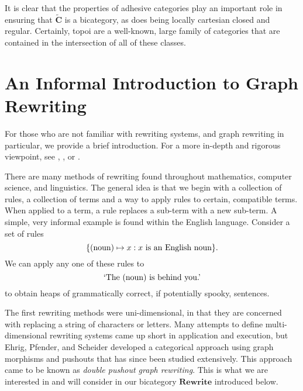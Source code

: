 \documentclass[11pt]{amsart}
\newcommand{\cat}[1]{\mathbf{#1}}
\renewcommand{\t}[1]{\textup{#1}}
\newcommand{\csC}{\widetilde{\mathbf{C}}}
\theoremstyle{remark}
\theoremstyle{definition}
\begin{document}
It is clear that the properties of adhesive categories play an important role in ensuring that $\csC$ is a bicategory, as does being locally cartesian closed and regular.  Certainly, topoi are a well-known, large family of categories that are contained in the intersection of all of these classes. 
%
%
%
%
%
%
%
%
%
%
%
%
%
%
%
%
%
%
%
\section{An Informal Introduction to Graph Rewriting}  %
\label{sec.Rewriting}
%

For those who are not familiar with rewriting systems, and graph rewriting in particular, we provide a brief introduction. For a more in-depth and rigorous viewpoint, see \cite{Baader_TermRewritingAllThat}, \cite{Ehrig_GraphGramAlgAp}, or \cite{LackSoboc_AdhesiveCategories}.

There are many methods of rewriting found throughout mathematics, computer science, and linguistics. The general idea is that we begin with a collection of rules, a collection of terms and a way to apply rules to certain, compatible terms.  When applied to a term, a rule replaces a sub-term with a new sub-term. A simple, very informal example is found within the English language.  Consider a set of rules 
\[
\{ \t{(noun)} \mapsto x : x \t{ is an 
	English noun} \}.
\]
We can apply any one of these rules to
\[
\t{`The (noun) is behind you.'}
\] 
to obtain heaps of grammatically correct, if potentially spooky, sentences.  

The first rewriting methods were uni-dimensional, in that they are concerned with replacing a string of characters or letters. Many attempts to define multi-dimensional rewriting systems came up short in application and execution, but Ehrig, Pfender, and Scheider developed a categorical approach using graph morphisms and pushouts  \cite{Ehrig_GraphGramAlgAp} that has since been studied extensively. This approach came to be known as \textit{double pushout graph rewriting}. This is what we are interested in and will consider in our bicategory $\cat{Rewrite}$ introduced below.
\end{document}
